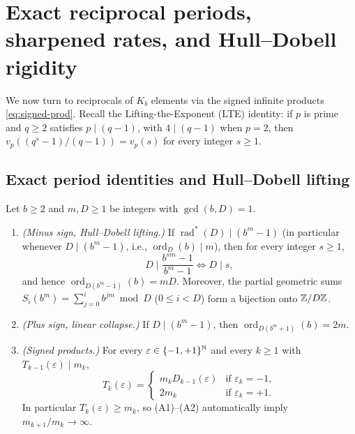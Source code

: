 \documentclass[11pt]{article}
\DeclareMathOperator{\ord}{ord}
\DeclareMathOperator{\rad}{rad}
\begin{document}
\section{Exact reciprocal periods, sharpened rates, and Hull--Dobell rigidity}\label{sec:periods}

We now turn to reciprocals of $K_b$ elements via the signed infinite products \eqref{eq:signed-prod}. Recall the Lifting-the-Exponent (LTE) identity: if $p$ is prime and $q\ge2$ satisfies $p\mid(q-1)$, with $4\mid(q-1)$ when $p=2$, then $v_p((q^s-1)/(q-1))=v_p(s)$ for every integer $s\ge1$.

\subsection{Exact period identities and Hull--Dobell lifting}

\begin{theorem}\label{thm:periods}
Let $b\ge2$ and $m,D\ge1$ be integers with $\gcd(b,D)=1$.
\begin{enumerate}[label=\textup{(\roman*)},nosep]
\item \emph{(Minus sign, Hull--Dobell lifting.)} If $\rad^*(D)\mid(b^m-1)$ (in particular whenever $D\mid(b^m-1)$, i.e., $\ord_D(b)\mid m$), then for every integer $s\ge1$,
\[
D\mid\frac{b^{sm}-1}{b^m-1}\iff D\mid s,
\]
and hence $\ord_{D(b^m-1)}(b)=mD$. Moreover, the partial geometric sums $S_i(b^m)=\sum_{j=0}^i b^{jm}\bmod D$ ($0\le i<D$) form a bijection onto $\mathbb Z/D\mathbb Z$.
\item \emph{(Plus sign, linear collapse.)} If $D\mid(b^m-1)$, then $\ord_{D(b^m+1)}(b)=2m$.
\item \emph{(Signed products.)} For every $\varepsilon\in\{-1,+1\}^{\mathbb N}$ and every $k\ge1$ with $T_{k-1}(\varepsilon)\mid m_k$,
\[
T_k(\varepsilon)=\begin{cases} m_k D_{k-1}(\varepsilon) & \text{if }\varepsilon_k=-1,\\ 2m_k & \text{if }\varepsilon_k=+1. \end{cases}
\]
In particular $T_k(\varepsilon)\ge m_k$, so \textup{(A1)}--\textup{(A2)} automatically imply $m_{k+1}/m_k\to\infty$.
\end{enumerate}
\end{theorem}
\end{document}
